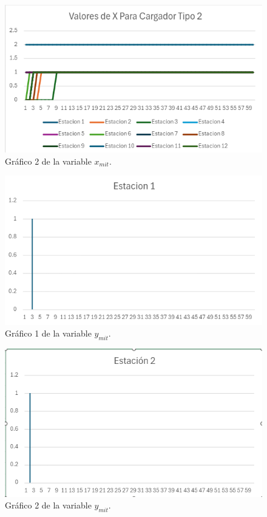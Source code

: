 \documentclass[letterpaper]{article}
\begin{document}
\begin{flushleft}
		\begin{figure}[htbp]
			\centering
			\includegraphics[scale=0.9]{imagenes/anexo_xmit2.png}
			\caption{Gráfico 2 de la variable $x_{mit}$.}
			\label{fig:grafica-xmit2}
		\end{figure}

		\begin{figure}[htbp]
			\centering
			\includegraphics[scale=0.9]{imagenes/ymit1.png}
			\caption{Gráfico 1 de la variable $y_{mit}$.}
			\label{fig:grafica-ymit1}
		\end{figure}

		\begin{figure}[htbp]
			\centering
			\includegraphics[scale=0.9]{imagenes/ymit2.png}
			\caption{Gráfico 2 de la variable $y_{mit}$.}
			\label{fig:grafica-ymit2}
		\end{figure}


\end{flushleft}
\end{document}

